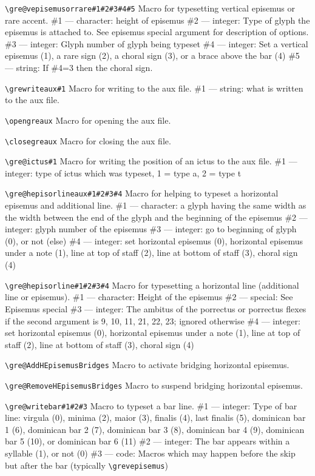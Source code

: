 \verb=\gre@vepisemusorrare#1#2#3#4#5=%
	Macro for typesetting vertical episemus or rare accent.
	\#1 --- character: height of episemus
	\#2 --- integer: Type of glyph the episemus is attached to.  See episemus special argument for description of options.
	\#3 --- integer: Glyph number of glyph being typeset
	\#4 --- integer: Set a vertical episemus (1), a rare sign (2), a choral sign (3), or a brace above the bar (4)
	\#5 --- string: If \#4=3 then the choral sign.

\verb=\grewriteaux#1=%
	Macro for writing to the aux file.
	\#1 --- string: what is written to the aux file.

\verb=\opengreaux=%
	Macro for opening the aux file.

\verb=\closegreaux=%
	Macro for closing the aux file.

\verb=\gre@ictus#1=%
	Macro for writing the position of an ictus to the aux file.
	\#1 --- integer: type of ictus which was typeset, 1 = type a, 2 = type t

\verb=\gre@hepisorlineaux#1#2#3#4=%
	Macro for helping to typeset a horizontal episemus and additional line.
	\#1 --- character: a glyph having the same width as the width between the end of the glyph and the beginning of the episemus
	\#2 --- integer: glyph number of the episemus
	\#3 --- integer: go to beginning of glyph (0), or not (else)
	\#4 --- integer: set horizontal episemus (0), horizontal episemus under a note (1), line at top of staff (2), line at bottom of staff (3), choral sign (4)

\verb=\gre@hepisorline#1#2#3#4=%
	Macro for typesetting a horizontal line (additional line or episemus).
	\#1 --- character: Height of the episemus
	\#2 --- special: See Episemus special
	\#3 --- integer: The ambitus of the porrectus or porrectus flexes if the second argument is 9, 10, 11, 21, 22, 23; ignored otherwise
	\#4 --- integer: set horizontal episemus (0), horizontal episemus under a note (1), line at top of staff (2), line at bottom of staff (3), choral sign (4)

\verb=\gre@AddHEpisemusBridges=%
	Macro to activate bridging horizontal episemus.
	
\verb=\gre@RemoveHEpisemusBridges=%
	Macro to suspend bridging horizontal episemus.

\verb=\gre@writebar#1#2#3=%
	Macro to typeset a bar line.
	\#1 --- integer: Type of bar line: virgula (0), minima (2), maior (3), finalis (4), last finalis (5), dominican bar 1 (6), dominican bar 2 (7), dominican bar 3 (8), dominican bar 4 (9), dominican bar 5 (10), or dominican bar 6 (11)
	\#2 --- integer: The bar appears within a syllable (1), or not (0)
	\#3 --- code: Macros which may happen before the skip but after the bar (typically \verb=\grevepisemus=)

